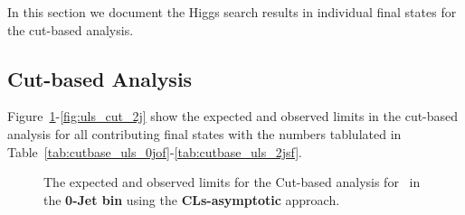 In this section we document the Higgs search results in individual final states for the cut-based analysis.  

\subsection{Cut-based Analysis}

Figure~\ref{fig:uls_cut_0j}-\ref{fig:uls_cut_2j} show the expected and observed limits in the cut-based analysis 
for all contributing final states with the numbers tablulated in Table~\ref{tab:cutbase_uls_0jof}-\ref{tab:cutbase_uls_2jsf}. 

\begin{figure}[!hbtp]
\centering
{}
\caption{The expected and observed limits for the Cut-based analysis for \intlumiEightTeV\ in the {\bf 0-Jet bin} 
using the {\bf CLs-asymptotic} approach. }
\label{fig:uls_cut_0j}
\end{figure}


